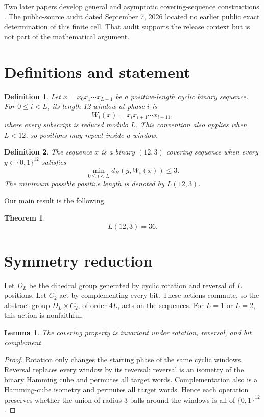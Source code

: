 \documentclass[11pt]{article}
\newtheorem{theorem}{Theorem}
\newtheorem{lemma}{Lemma}
\newtheorem{definition}{Definition}
\begin{document}
Two later papers develop general and asymptotic covering-sequence
constructions \cite{etzion-2026,ta-vu-2026}. The public-source audit dated
September 7, 2026 located no earlier public exact determination of this
finite cell. That audit supports the release context but is not part of the
mathematical argument.

\section{Definitions and statement}

\begin{definition}
Let \(x=x_0x_1\cdots x_{L-1}\) be a positive-length cyclic binary sequence.
For \(0\leq i<L\), its length-12 window at phase \(i\) is
\[
  W_i(x)=x_i x_{i+1}\cdots x_{i+11},
\]
where every subscript is reduced modulo \(L\). This convention also applies
when \(L<12\), so positions may repeat inside a window.
\end{definition}

\begin{definition}
The sequence \(x\) is a binary \((12,3)\) covering sequence when every
\(y\in\{0,1\}^{12}\) satisfies
\[
  \min_{0\leq i<L} d_H(y,W_i(x))\leq 3.
\]
The minimum possible positive length is denoted by \(L(12,3)\).
\end{definition}

Our main result is the following.

\begin{theorem}\label{thm:main}
\[
  L(12,3)=36.
\]
\end{theorem}

\section{Symmetry reduction}

Let \(D_L\) be the dihedral group generated by cyclic rotation and reversal
of \(L\) positions. Let \(C_2\) act by complementing every bit. These actions
commute, so the abstract group \(D_L\times C_2\), of order \(4L\), acts on
the sequences. For \(L=1\) or \(L=2\), this action is nonfaithful.

\begin{lemma}\label{lem:invariance}
The covering property is invariant under rotation, reversal, and bit
complement.
\end{lemma}

\begin{proof}
Rotation only changes the starting phase of the same cyclic windows.
Reversal replaces every window by its reversal; reversal is an isometry of
the binary Hamming cube and permutes all target words. Complementation also
is a Hamming-cube isometry and permutes all target words. Hence each
operation preserves whether the union of radius-3 balls around the windows
is all of \(\{0,1\}^{12}\).
\end{proof}
\end{document}
